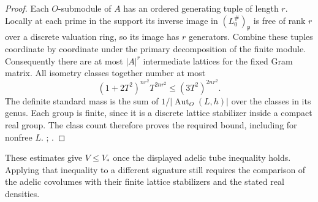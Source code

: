 \begin{proof}
Each \(O\)-submodule of \(A\) has an ordered generating tuple of
length \(r\). Locally at each prime in the support its inverse image
in \((L_0^\#)_{\mathfrak p}\) is free of rank \(r\) over a discrete
valuation ring, so its image has \(r\) generators. Combine these
tuples coordinate by coordinate under the primary decomposition of
the finite module. Consequently there are at most \(|A|^r\)
intermediate lattices for the fixed Gram matrix. All isometry
classes together number at most
\[
 (1+2T^2)^{nr^2}T^{2nr^2}\le (3T^2)^{2nr^2}.
\]
The definite standard mass is the sum of
\(1/|\operatorname{Aut}_O(L,h)|\) over the classes in its genus.
Each group is finite, since it is a discrete lattice stabilizer
inside a compact real group. The class count therefore proves
the required bound, including for nonfree \(L\).
;
.
\end{proof}

These estimates give \(V\le V_*\) once the displayed adelic tube
inequality holds. Applying that inequality to a different signature
still requires the comparison of the adelic covolumes with their
finite lattice stabilizers and the stated real densities.
